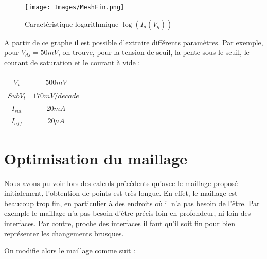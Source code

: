 \documentclass[a4paper,11pt]{report}
\begin{document}
\begin{figure}[H]
\centering
    \texttt{[image: Images/MeshFin.png]}
    \caption{Caractéristique logarithmique $\log(I_d(V_g))$}
    \label{logIdVgmeshfin}
\end{figure}



A partir de ce graphe il est possible d'extraire différents paramètres. Par exemple, pour $V_{ds}=50mV$, on trouve, pour la tension de seuil, la pente sous le seuil, le courant de saturation et le courant à vide :

\begin{tableau}[H]
\centering
\begin{tabular}{|c|c|}
\hline
$V_t$&$500mV$\\
\hline
$SubV_t$&$170mV/decade$\\
\hline
$I_{sat}$&$20mA$\\
\hline
$I_{off}$&$20\mu A$\\
\hline
\end{tabular}
\caption{Caractéristiques avec un maillage fin pour $V_{ds}=50mV$}

\end{tableau}



\section{Optimisation du maillage}

Nous avons pu voir lors des calculs précédents qu'avec le maillage proposé initialement, l'obtention de points est très longue. En effet, le maillage est beaucoup trop fin, en particulier à des endroits où il n'a pas besoin de l'être. Par exemple le maillage n'a pas besoin d'être précis loin en profondeur, ni loin des interfaces. Par contre, proche des interfaces il faut qu'il soit fin pour bien représenter les changements brusques.
 
\vspace{0.3cm}

On modifie alors le maillage comme suit :
\vspace{0.3cm}

\noindent{}
\vspace{0.3cm}
\end{document}
